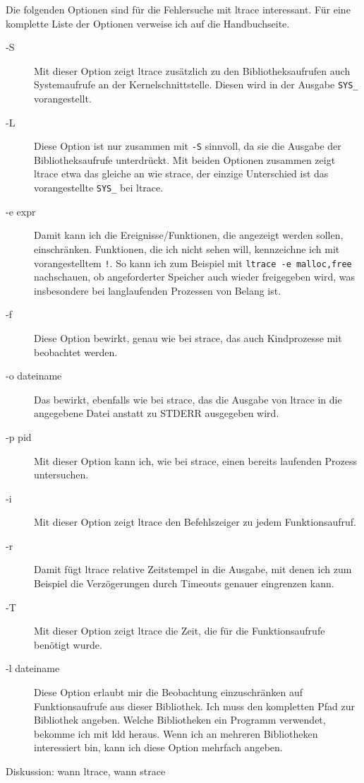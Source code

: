 \begin{normaltext}
  Die folgenden Optionen sind für die Fehlersuche mit ltrace interessant. Für
  eine komplette Liste der Optionen verweise ich auf die Handbuchseite.
  \begin{description}
    \item[-S] Mit dieser Option zeigt ltrace zusätzlich zu den
      Bibliotheksaufrufen auch Systemaufrufe an der Kernelschnittstelle.
      Diesen wird in der Ausgabe \verb?SYS_? vorangestellt.
    \item[-L] Diese Option ist nur zusammen mit \verb?-S? sinnvoll, da sie die
      Ausgabe der Bibliotheksaufrufe unterdrückt. Mit beiden Optionen zusammen
      zeigt ltrace etwa das gleiche an wie strace, der einzige Unterschied ist
      das vorangestellte \verb?SYS_? bei ltrace.
    \item[-e expr] Damit kann ich die Ereignisse/Funktionen, die angezeigt
      werden sollen, einschränken. Funktionen, die ich nicht sehen will,
      kennzeichne ich mit vorangestelltem \verb?!?. So kann ich zum Beispiel
      mit \verb?ltrace -e malloc,free? nachschauen, ob angeforderter Speicher
      auch wieder freigegeben wird, was insbesondere bei langlaufenden
      Prozessen von Belang ist.
    \item[-f] Diese Option bewirkt, genau wie bei strace, das auch
      Kindprozesse mit beobachtet werden.
    \item[-o dateiname] Das bewirkt, ebenfalls wie bei strace, das die Ausgabe
      von ltrace in die angegebene Datei anstatt zu STDERR ausgegeben wird.
    \item[-p pid] Mit dieser Option kann ich, wie bei strace, einen bereits
      laufenden Prozess untersuchen.
    \item[-i] Mit dieser Option zeigt ltrace den Befehlszeiger zu jedem
      Funktionsaufruf.
    \item[-r] Damit fügt ltrace relative Zeitstempel in die Ausgabe, mit denen
      ich zum Beispiel die Verzögerungen durch Timeouts genauer eingrenzen
      kann.
    \item[-T] Mit dieser Option zeigt ltrace die Zeit, die für die
      Funktionsaufrufe benötigt wurde.
    \item[-l dateiname] Diese Option erlaubt mir die Beobachtung
      einzuschränken auf Funktionsaufrufe aus dieser Bibliothek. Ich muss den
      kompletten Pfad zur Bibliothek angeben. Welche Bibliotheken ein Programm
      verwendet, bekomme ich mit ldd heraus. Wenn ich an mehreren Bibliotheken
      interessiert bin, kann ich diese Option mehrfach angeben.
  \end{description}
  \begin{notes}
  \item Diskussion: wann ltrace, wann strace
  \end{notes}
\end{normaltext}

